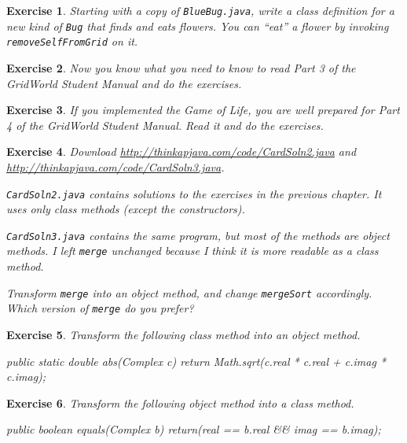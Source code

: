 \documentclass[12pt]{book}
\theoremstyle{exercise}
\newtheorem{exercise}{Exercise}[chapter]
\newcommand{\java}[1]{\lstinline{#1}} %
\begin{document}
\begin{exercise}
Starting with a copy of \java{BlueBug.java}, write a class definition for a new kind of \java{Bug} that finds and eats flowers.
You can ``eat'' a flower by invoking \java{removeSelfFromGrid} on it.
\end{exercise}


\begin{exercise}
Now you know what you need to know to read Part 3 of the GridWorld Student Manual and do the exercises.
\end{exercise}


\begin{exercise}
If you implemented the Game of Life, you are well prepared for Part 4 of the GridWorld Student Manual.
Read it and do the exercises.
\end{exercise}


\begin{exercise}

Download \url{http://thinkapjava.com/code/CardSoln2.java} and \url{http://thinkapjava.com/code/CardSoln3.java}.

\java{CardSoln2.java} contains solutions to the exercises in the previous chapter.
It uses only class methods (except the constructors).

\java{CardSoln3.java} contains the same program, but most of the methods are object methods.
I left \java{merge} unchanged because I think it is more readable as a class method.

Transform \java{merge} into an object method, and change \java{mergeSort} accordingly.
Which version of \java{merge} do you prefer?

\end{exercise}


\begin{exercise}

Transform the following class method into an object method.

\begin{code}
public static double abs(Complex c) {
    return Math.sqrt(c.real * c.real + c.imag * c.imag);
}
\end{code}
\end{exercise}


\begin{exercise}
Transform the following object method into a class method.

\begin{code}
public boolean equals(Complex b) {
    return(real == b.real && imag == b.imag);
}
\end{code}
\end{exercise}
\end{document}
